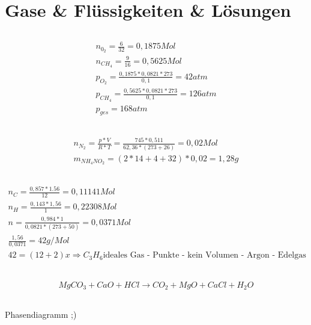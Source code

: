 \documentclass[a4paper]{article}
\begin{document}
\section{Gase \& Flüssigkeiten \& Lösungen}
\subsection{}
\begin{align}
  n_{0_2}=\frac{6}{32}=0,1875Mol\\
  n_{CH_4}=\frac{9}{16}=0,5625Mol\\
  p_{O_2}=\frac{0,1875*0,0821*273}{0,1}=42 atm\\
  p_{CH_4}=\frac{0,5625*0,0821*273}{0,1}=126 atm\\
  p_{ges}=168 atm
\end{align}

\subsection{}
\begin{align}
  n_{N_2}=\frac{p*V}{R*T}=\frac{745*0,511}{62,36*(273+26)}=0,02 Mol\\
  m_{NH_4NO_2}=(2*14+4+32)*0,02=1,28g
\end{align}

\subsection{}
\begin{align}
  n_C=\frac{0,857*1.56}{12}=0,11141 Mol\\
  n_H=\frac{0,143*1,56}{1}=0,22308 Mol\\
  n = \frac{0,984*1}{0,0821*(273+50)}=0,0371 Mol\\
  \frac{1,56}{0,0371}=42g/Mol\\
  42=(12+2)x \Rightarrow C_3H_{6}
  \text{ideales Gas - Punkte - kein Volumen - Argon - Edelgas}
\end{align}

\subsection{}
\begin{align}
  MgCO_3 + CaO + HCl \rightarrow CO_2 + MgO + CaCl + H_2O  
\end{align}

\subsection{}
Phasendiagramm ;)
\end{document}
